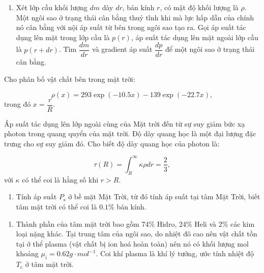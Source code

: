 \begin{enumerate}
\item Xét lớp cầu khối lượng $dm$ dày $dr$, bán kính $r$, có mật độ khối lượng là $\rho$. Một ngôi sao ở trạng thái cân bằng thuỷ tĩnh khi mà lực hấp dẫn của chính nó cân bằng với nội áp suất từ bên trong ngôi sao tạo ra. Gọi áp suất tác dụng lên mặt trong lớp cầu là $p(r)$, áp suất tác dụng lên mặt ngoài lớp cầu là $p(r+dr)$. Tìm  $\dfrac{dm}{dr}$ và gradient áp suất $\dfrac{dp}{dr}$ để một ngôi sao ở trạng thái cân bằng.
\end{enumerate}
\begin{center}
    

\end{center}
Cho phân bố vật chất bên trong mặt trời:

\begin{equation}
\rho(x)=293\exp{(-10.5x)}-139\exp{(-22.7x)} ,
\end{equation}
trong đó $x=\dfrac{r}{R}$.

Áp suất tác dụng lên lớp ngoài cùng của Mặt trời đến từ sự suy giảm bức xạ photon trong quang quyển của mặt trời. Độ dày quang học là một đại lượng đặc trưng cho sự suy giảm đó. Cho biết độ dày quang học của photon là:

\begin{equation}
    \tau(R)=\int_R^\infty \kappa \rho dr =\dfrac{2}{3},
\end{equation}
với $\kappa$ có thể coi là hằng số khi $r>R$. 
\begin{enumerate}[resume]
    \item Tính áp suất $P_\text{s}$ ở bề mặt Mặt Trời, từ đó tính áp suất tại tâm Mặt Trời, biết tâm mặt trời có thể coi là $0.1\%$ bán kính.
\end{enumerate}
\begin{enumerate}[resume]
        \item Thành phần của tâm mặt trời bao gồm 74\% Hidro, 24\% Heli và 2\% các kim loại nặng khác. Tại trung tâm của ngôi sao, do nhiệt đô cao nên vật chất tồn tại ở thể plasma (vật chất bị ion hoá hoàn toàn) nên nó có khối lượng mol khoảng $\mu_i=0.62 \si{g \cdot mol^{-1}}$. Coi khí plasma là khí lý tưởng, ước tính nhiệt độ $T_\text{c}$ ở tâm mặt trời.
\end{enumerate}

